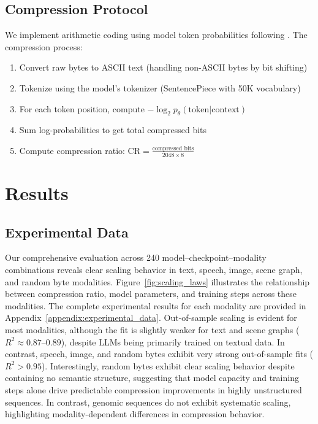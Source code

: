 \documentclass[11pt]{article}
\begin{document}
\subsection{Compression Protocol}

We implement arithmetic coding using model token probabilities following \citet{deletang2023compression}. The compression process:

\begin{enumerate}
\item Convert raw bytes to ASCII text (handling non-ASCII bytes by bit shifting)
\item Tokenize using the model's tokenizer (SentencePiece with 50K vocabulary)
\item For each token position, compute $-\log_2 p_\theta(\text{token}|\text{context})$
\item Sum log-probabilities to get total compressed bits
\item Compute compression ratio: $\mathrm{CR} = \frac{\text{compressed bits}}{2048 \times 8}$
\end{enumerate}

\section{Results}

\subsection{Experimental Data}

Our comprehensive evaluation across 240 model–checkpoint–modality combinations reveals clear scaling behavior in text, speech, image, scene graph, and random byte modalities. Figure~\ref{fig:scaling_laws} illustrates the relationship between compression ratio, model parameters, and training steps across these modalities. The complete experimental results for each modality are provided in Appendix~\ref{appendix:experimental_data}. Out-of-sample scaling is evident for most modalities, although the fit is slightly weaker for text and scene graphs ($R^2 \approx 0.87–0.89$), despite LLMs being primarily trained on textual data. In contrast, speech, image, and random bytes exhibit very strong out-of-sample fits ($R^2 > 0.95$). Interestingly, random bytes exhibit clear scaling behavior despite containing no semantic structure, suggesting that model capacity and training steps alone drive predictable compression improvements in highly unstructured sequences. In contrast, genomic sequences do not exhibit systematic scaling, highlighting modality-dependent differences in compression behavior.
\end{document}
